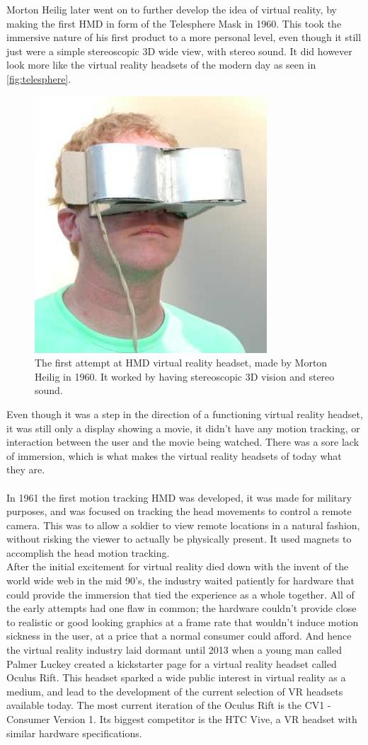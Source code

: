 			Morton Heilig later went on to further develop the idea of virtual reality, by making the first HMD in form of the Telesphere Mask\cite{VRS} in 1960. This took the immersive nature of his first product to a more personal level, even though it still just were a simple stereoscopic 3D wide view, with stereo sound. It did however look more like the virtual reality headsets of the modern day as seen in \autoref{fig:telesphere}.
			\begin{figure}[H]
				\centering
				\includegraphics[width=0.25\linewidth]{figure/Analysis/TelesphereMask}
				\caption{The first attempt at HMD virtual reality headset, made by Morton Heilig in 1960. It worked by having stereoscopic 3D vision and stereo sound.}
				\label{fig:telesphere}
			\end{figure}
			Even though it was a step in the direction of a functioning virtual reality headset, it was still only a display showing a movie, it didn't have any motion tracking, or interaction between the user and the movie being watched. There was a sore lack of immersion, which is what makes the virtual reality headsets of today what they are.\\\\

			In 1961 the first motion tracking HMD was developed\cite{VRS}, it was made for military purposes, and was focused on tracking the head movements to control a remote camera. This was to allow a soldier to view remote locations in a natural fashion, without risking the viewer to actually be physically present. It used magnets to accomplish the head motion tracking.\\
			
			After the initial excitement for virtual reality died down with the invent of the world wide web in the mid 90's, the industry waited patiently for hardware that could provide the immersion that tied the experience as a whole together. All of the early attempts had one flaw in common; the hardware couldn't provide close to realistic or good looking graphics at a frame rate that wouldn't induce motion sickness in the user, at a price that a normal consumer could afford\cite{vergeVR}. And hence the virtual reality industry laid dormant until 2013 when a young man called Palmer Luckey created a kickstarter page for a virtual reality headset called Oculus Rift\cite{createOculus}. This headset sparked a wide public interest in virtual reality as a medium, and lead to the development of the current selection of VR headsets available today. The most current iteration of the Oculus Rift is the CV1 - Consumer Version 1. Its biggest competitor is the HTC Vive, a VR headset with similar hardware specifications. 
